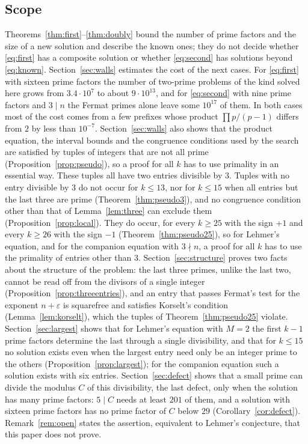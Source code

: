\documentclass[11pt,reqno]{amsart}
\numberwithin{equation}{section}
\theoremstyle{plain}
\theoremstyle{definition}
\theoremstyle{remark}
\begin{document}
\subsection{Scope}
Theorems~\ref{thm:first}--\ref{thm:doubly} bound the number of prime
factors and the size of a new solution and describe the known ones; they do not
decide whether \eqref{eq:first} has a composite solution or whether
\eqref{eq:second} has solutions beyond \eqref{eq:known}. Section~\ref{sec:walls}
estimates the cost of the next cases. For \eqref{eq:first} with sixteen prime
factors the number of two-prime problems of the kind solved here grows
from $3.4\cdot10^7$ to about $9\cdot10^{13}$, and for \eqref{eq:second}
with nine prime factors and $3\mid n$ the Fermat primes alone leave
some $10^{17}$ of them. In both cases most of the cost comes from a few
prefixes whose product $\prod p/(p-1)$ differs from $2$ by less than
$10^{-7}$. Section~\ref{sec:walls} also shows that the
product equation, the interval bounds and the congruence conditions used
by the search are satisfied by tuples of integers that are not all
prime (Proposition~\ref{prop:pseudo}), so a proof for all $k$ has to
use primality in an essential way. These tuples all have two entries
divisible by $3$. Tuples with no entry divisible by $3$ do not occur for
$k\le13$, nor for $k\le15$ when all entries but the last three are
prime (Theorem~\ref{thm:pseudo3}), and no congruence condition other
than that of Lemma~\ref{lem:three} can exclude them
(Proposition~\ref{prop:local}). They do occur, for every $k\ge25$
with the sign $+1$ and every $k\ge26$ with the sign $-1$
(Theorem~\ref{thm:pseudo25}), so for Lehmer's equation, and for the
companion equation with $3\nmid n$, a proof for all $k$ has to use the
primality of entries other than $3$. Section~\ref{sec:structure}
proves two facts about the structure of the problem: the last three
primes, unlike the last two, cannot be read off from the divisors of a
single integer (Proposition~\ref{prop:threeentries}), and an entry that
passes Fermat's test for the exponent $n+\varepsilon$ is squarefree and
satisfies Korselt's condition (Lemma~\ref{lem:korselt}), which the
tuples of Theorem~\ref{thm:pseudo25} violate. Section~\ref{sec:largest}
shows that for Lehmer's equation with $M=2$ the first $k-1$ prime
factors determine the last through a single divisibility, and that
for $k\le15$ no solution exists even when the largest entry need only
be an integer prime to the others (Proposition~\ref{prop:largest}); for
the companion equation such a solution exists with six entries.
Section~\ref{sec:defect} shows that a small prime can divide the
modulus $C$ of this divisibility, the last defect, only when the
solution has many prime factors: $5\mid C$ needs at least $201$ of them, and a
solution with sixteen prime factors has no prime factor of $C$ below
$29$ (Corollary~\ref{cor:defect}). Remark~\ref{rem:open} states the
assertion, equivalent to Lehmer's conjecture, that this paper does not
prove.
\end{document}
